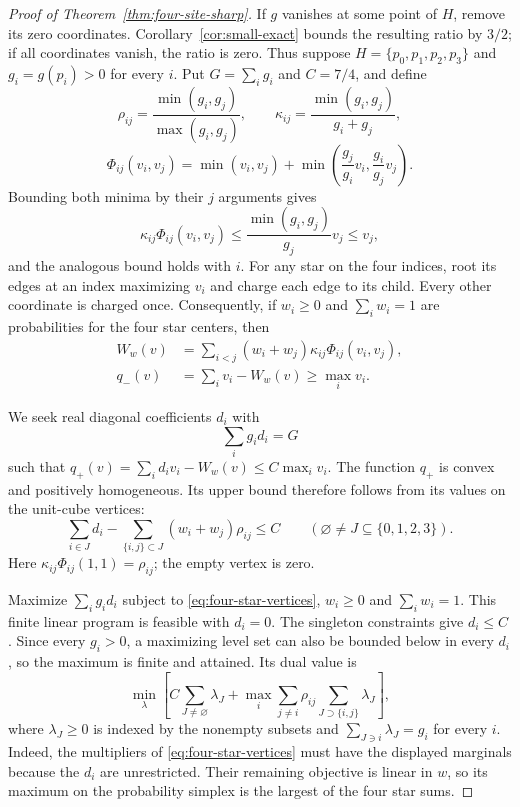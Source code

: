 \begin{proof}[Proof of Theorem~\ref{thm:four-site-sharp}]
If $g$ vanishes at some point of $H$, remove its zero coordinates.
Corollary~\ref{cor:small-exact} bounds the resulting ratio by $3/2$;
if all coordinates vanish, the ratio is zero. Thus suppose
$H=\{p_0,p_1,p_2,p_3\}$ and $g_i=g(p_i)>0$ for every $i$.
Put $G=\sum_i g_i$ and $C=7/4$, and define
\[
 \rho_{ij}=\frac{\min(g_i,g_j)}{\max(g_i,g_j)},\qquad
 \kappa_{ij}=\frac{\min(g_i,g_j)}{g_i+g_j},
\]
\[
 \Phi_{ij}(v_i,v_j)=\min(v_i,v_j)
 +\min\left(\frac{g_j}{g_i}v_i,\frac{g_i}{g_j}v_j\right).
\]
Bounding both minima by their $j$ arguments gives
\[
 \kappa_{ij}\Phi_{ij}(v_i,v_j)
 \le\frac{\min(g_i,g_j)}{g_j}v_j\le v_j,
\]
and the analogous bound holds with $i$. For any star on the four
indices, root its edges at an index maximizing $v_i$ and charge each
edge to its child. Every other coordinate is charged once. Consequently,
if $w_i\ge0$ and $\sum_i w_i=1$ are probabilities for the four star
centers, then
\[
 \begin{aligned}
 W_w(v)&=\sum_{i<j}(w_i+w_j)\kappa_{ij}\Phi_{ij}(v_i,v_j),\\
 q_-(v)&=\sum_i v_i-W_w(v)\ge\max_i v_i.
 \end{aligned}
\]

We seek real diagonal coefficients $d_i$ with
\begin{equation}\label{eq:four-star-trace}
 \sum_i g_i d_i=G
\end{equation}
such that $q_+(v)=\sum_i d_i v_i-W_w(v)\le C\max_i v_i$.
The function $q_+$ is convex and positively homogeneous. Its upper
bound therefore follows from its values on the unit-cube vertices:
\begin{equation}\label{eq:four-star-vertices}
 \sum_{i\in J}d_i-
 \sum_{\{i,j\}\subset J}(w_i+w_j)\rho_{ij}\le C
 \qquad(\varnothing\ne J\subseteq\{0,1,2,3\}).
\end{equation}
Here $\kappa_{ij}\Phi_{ij}(1,1)=\rho_{ij}$; the empty vertex is zero.

Maximize $\sum_i g_i d_i$ subject to
\eqref{eq:four-star-vertices}, $w_i\ge0$ and $\sum_iw_i=1$.
This finite linear program is feasible with $d_i=0$.
The singleton constraints give $d_i\le C$. Since every $g_i>0$,
a maximizing level set can also be bounded below in every $d_i$,
so the maximum is finite and attained.
Its dual value is
\begin{equation}\label{eq:four-star-dual}
 \min_\lambda\left[
 C\sum_{J\ne\varnothing}\lambda_J+
 \max_i\sum_{j\ne i}\rho_{ij}
              \sum_{J\supset\{i,j\}}\lambda_J
 \right],
\end{equation}
where $\lambda_J\ge0$ is indexed by the nonempty subsets and
$\sum_{J\ni i}\lambda_J=g_i$ for every $i$.
Indeed, the multipliers of \eqref{eq:four-star-vertices} must have
the displayed marginals because the $d_i$ are unrestricted.
Their remaining objective is linear in $w$, so its maximum on the
probability simplex is the largest of the four star sums.


\end{proof}
